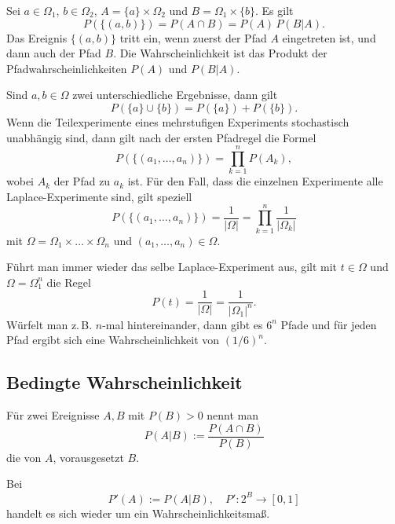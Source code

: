 Sei $a\in\Omega_1$, $b\in\Omega_2$, $A=\{a\}\times\Omega_2$
und $B=\Omega_1\times\{b\}$. Es gilt
\begin{equation}
P(\{(a,b)\}) = P(A\cap B) = P(A)\,P(B|A).
\end{equation}
Das Ereignis $\{(a,b)\}$ tritt ein, wenn zuerst
der Pfad $A$ eingetreten ist, und dann auch der Pfad $B$.
Die Wahrscheinlichkeit ist das Produkt der Pfadwahrscheinlichkeiten
$P(A)$ und $P(B|A)$.

Sind $a,b\in\Omega$ zwei unterschiedliche
Ergebnisse, dann gilt
\begin{equation}
P(\{a\}\cup\{b\}) = P(\{a\})+P(\{b\}).
\end{equation}
Wenn die Teilexperimente eines mehrstufigen Experiments
stochastisch unabhängig sind, dann gilt nach der ersten Pfadregel
die Formel
\begin{equation}
P(\{(a_1,\ldots,a_n)\}) = \prod_{k=1}^n P(A_k),
\end{equation}
wobei $A_k$ der Pfad zu $a_k$ ist.
Für den Fall, dass die einzelnen
Experimente alle Laplace-Experimente sind, gilt speziell
\begin{equation}
P(\{(a_1,\ldots,a_n)\}) = \frac{1}{|\Omega|} = \prod_{k=1}^n \frac{1}{|\Omega_k|}
\end{equation}
mit $\Omega=\Omega_1\times\ldots\times\Omega_n$ und $(a_1,\ldots,a_n)\in\Omega$.

Führt man immer wieder das selbe Laplace-Experiment aus, gilt
mit $t\in\Omega$ und $\Omega=\Omega_1^n$ die Regel
\begin{equation}
P(t) = \frac{1}{|\Omega|} = \frac{1}{|\Omega_1|^n}.
\end{equation}
Würfelt man z.\,B. $n$-mal hintereinander, dann gibt es $6^n$ Pfade
und für jeden Pfad ergibt sich eine Wahrscheinlichkeit von $(1/6)^n$.

\subsection{Bedingte Wahrscheinlichkeit}
\begin{definition}%
Für zwei Ereignisse $A,B$ mit $P(B)>0$ nennt man
\begin{equation}
P(A|B) := \frac{P(A\cap B)}{P(B)}
\end{equation}
die  von $A$, vorausgesetzt $B$.
\end{definition}
Bei
\begin{equation}
P'(A) := P(A|B),\quad P'\colon 2^B\to [0,1]
\end{equation}
handelt es sich wieder um ein Wahrscheinlichkeitsmaß.

